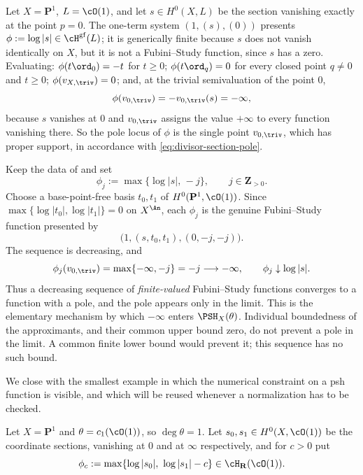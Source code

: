 \begin{example}
\label{ex:gf-proper-support-pole}
Let $X=\mathbf P^1$, $L=\cO(1)$, and let $s\in H^0(X,L)$ be the
section vanishing exactly at the point $p=0$.  The one-term system
$(1,(s),(0))$ presents
$\phi:=\log|s|\in\cH^{\mathrm{gf}}(L)$; it is generically finite because
$s$ does not vanish identically on $X$, but it is not a Fubini--Study
function, since $s$ has a zero.  Evaluating:
$\phi(t\ord_0)=-t$ for $t\ge0$; $\phi(t\ord_q)=0$ for every closed
point $q\ne0$ and $t\ge0$; $\phi(v_{X,\triv})=0$; and, at the trivial
semivaluation of the point $0$,
\[
 \phi(v_{0,\triv})=-v_{0,\triv}(s)=-\infty ,
\]
because $s$ vanishes at $0$ and $v_{0,\triv}$ assigns the value
$+\infty$ to every function vanishing there.  So the pole locus of
$\phi$ is the single point $v_{0,\triv}$, which has proper support, in
accordance with \eqref{eq:divisor-section-pole}.
\end{example}

\begin{example}
\label{ex:ch34-decreasing-to-pole}
Keep the data of  and set
\[
 \phi_j:=\max\{\log|s|,\,-j\},\qquad j\in\mathbf Z_{>0}.
\]
Choose a base-point-free basis $t_0,t_1$ of
$H^0(\mathbf P^1,\cO(1))$.  Since
$\max\{\log|t_0|,\log|t_1|\}=0$ on $X^{\An}$, each $\phi_j$ is the
genuine Fubini--Study function presented by
\[
                 \bigl(1,(s,t_0,t_1),(0,-j,-j)\bigr).
\]
The sequence is decreasing, and
\[
 \phi_j(v_{0,\triv})=\max\{-\infty,-j\}=-j\longrightarrow-\infty,
 \qquad
 \phi_j\downarrow\log|s| .
\]
Thus a decreasing sequence of \emph{finite-valued} Fubini--Study functions
converges to a function with a pole, and the pole appears only in the limit.
This is the elementary mechanism by which $-\infty$ enters
$\PSH_X(\theta)$.  Individual boundedness of the approximants, and their
common upper bound zero, do not prevent a pole in the limit.
A common finite lower bound would prevent it; this sequence has no
such bound.
\end{example}

We close with the smallest example in which the numerical constraint on a
psh function is visible, and which will be reused whenever a normalization
has to be checked.

Let $X=\mathbf P^1$ and $\theta=c_1(\cO(1))$, so $\deg\theta=1$.  Let
$s_0,s_1\in H^0(X,\cO(1))$ be the coordinate sections, vanishing at $0$
and at $\infty$ respectively, and for $c>0$ put
\begin{equation}
\label{eq:p1-fs}
 \phi_c:=\max\{\log|s_0|,\ \log|s_1|-c\}\in\cH_{\mathbf R}(\cO(1)).
\end{equation}

